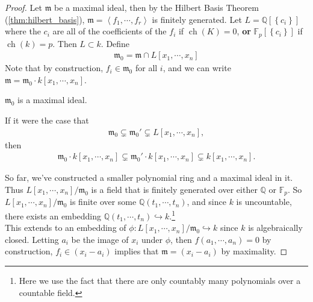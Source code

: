 \begin{proof}

Let \({\mathfrak{m}}\) be a maximal ideal, then by the Hilbert Basis
Theorem (\cref{thm:hilbert_basis}),
\({\mathfrak{m}}= \left\langle{f_1, \cdots, f_r}\right\rangle\) is
finitely generated. Let \(L = {\mathbb{Q}}[\left\{{c_i}\right\}]\) where
the \(c_i\) are all of the coefficients of the \(f_i\) if
\(\operatorname{ch}(K) = 0\), \textbf{or}
\({\mathbb{F}}_p[\left\{{c_i}\right\}]\) if
\(\operatorname{ch}(k) = p\). Then \(L\subset k\). Define
\begin{align*}
{\mathfrak{m}}_0 = {\mathfrak{m}}\cap L[x_1, \cdots, x_n]
\end{align*}
Note that by construction, \(f_i \in {\mathfrak{m}}_0\) for all \(i\),
and we can write
\({\mathfrak{m}}= {\mathfrak{m}}_0 \cdot k[x_1, \cdots, x_n]\).

\begin{claim}

\({\mathfrak{m}}_0\) is a maximal ideal.

\end{claim}

If it were the case that
\begin{align*}  
{\mathfrak{m}}_0 \subsetneq {\mathfrak{m}}_0' \subsetneq L[x_1, \cdots, x_n]
,\end{align*}
then
\begin{align*}  
{\mathfrak{m}}_0\cdot k[x_1, \cdots, x_n] \subsetneq {\mathfrak{m}}_0'\cdot k[x_1, \cdots, x_n]  \subsetneq k[x_1, \cdots, x_n]
.\end{align*}

So far, we've constructed a smaller polynomial ring and a maximal ideal
in it. Thus \(L[x_1, \cdots, x_n]/{\mathfrak{m}}_0\) is a field that is
finitely generated over either \({\mathbb{Q}}\) or \({\mathbb{F}}_p\).
So \(L[x_1, \cdots, x_n]/{\mathfrak{m}}_0\) is finite over some
\({\mathbb{Q}}(t_1, \cdots, t_n)\), and since \(k\) is uncountable,
there exists an embedding
\({\mathbb{Q}}(t_1, \cdots, t_n) \hookrightarrow k\).\footnote{Here we
  use the fact that there are only countably many polynomials over a
  countable field.}\\

This extends to an embedding of
\(\phi: L[x_1, \cdots, x_n]/{\mathfrak{m}}_0 \hookrightarrow k\) since
\(k\) is algebraically closed. Letting \(a_i\) be the image of \(x_i\)
under \(\phi\), then \(f(a_1, \cdots, a_n) = 0\) by construction,
\(f_i \in (x_i - a_i)\) implies that \({\mathfrak{m}}= (x_i - a_i)\) by
maximality.

\end{proof}

